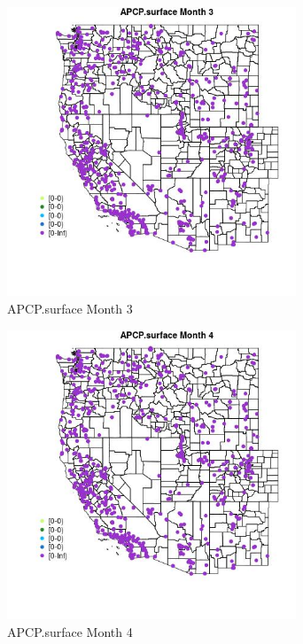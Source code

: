 \begin{figure} 
\centering  
\includegraphics[width=0.77\textwidth]{Code_Outputs/Report_ML_input_PM25_Step4_part_e_de_duplicated_aves_compiled_2019-05-21wNAs_MapObsMo3APCPsurface.jpg} 
\caption{\label{fig:Report_ML_input_PM25_Step4_part_e_de_duplicated_aves_compiled_2019-05-21wNAsMapObsMo3APCPsurface}APCP.surface Month 3} 
\end{figure} 
 

\clearpage 

\begin{figure} 
\centering  
\includegraphics[width=0.77\textwidth]{Code_Outputs/Report_ML_input_PM25_Step4_part_e_de_duplicated_aves_compiled_2019-05-21wNAs_MapObsMo4APCPsurface.jpg} 
\caption{\label{fig:Report_ML_input_PM25_Step4_part_e_de_duplicated_aves_compiled_2019-05-21wNAsMapObsMo4APCPsurface}APCP.surface Month 4} 
\end{figure} 
 

